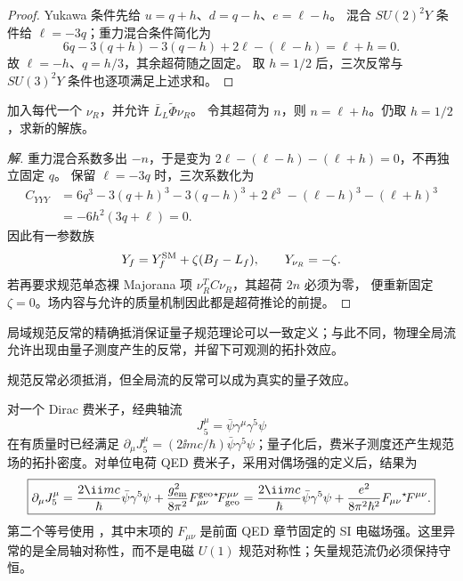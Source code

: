 \begin{proof}
Yukawa 条件先给 $u=q+h$、$d=q-h$、$e=\ell-h$。
混合 $SU(2)^2Y$ 条件给 $\ell=-3q$；重力混合条件简化为
\begin{equation*}
6q-3(q+h)-3(q-h)+2\ell-(\ell-h)=\ell+h=0.
\end{equation*}
故 $\ell=-h$、$q=h/3$，其余超荷随之固定。
取 $h=1/2$ 后，三次反常与 $SU(3)^2Y$ 条件也逐项满足上述求和。
\end{proof}

\begin{example}[加入右手中微子以后超荷约束怎样变化]
加入每代一个 $\nu_R$，并允许 $\bar L_L\widetilde\Phi\nu_R$。
令其超荷为 $n$，则 $n=\ell+h$。仍取 $h=1/2$，求新的解族。
\end{example}
\begin{proof}[解]
重力混合系数多出 $-n$，于是变为
$2\ell-(\ell-h)-(\ell+h)=0$，不再独立固定 $q$。
保留 $\ell=-3q$ 时，三次系数化为
\begin{align*}
C_{YYY}
&=6q^3-3(q+h)^3-3(q-h)^3
+2\ell^3-(\ell-h)^3-(\ell+h)^3\\
&=-6h^2(3q+\ell)=0.
\end{align*}
因此有一参数族
\begin{equation}
Y_f=Y_f^{\rm SM}+\zeta(B_f-L_f),\qquad Y_{\nu_R}=-\zeta.
\label{eq:sm-hypercharge-with-nur-family-dp126}
\end{equation}
若再要求规范单态裸 Majorana 项 $\nu_R^TC\nu_R$，其超荷 $2n$ 必须为零，
便重新固定 $\zeta=0$。场内容与允许的质量机制因此都是超荷推论的前提。
\end{proof}

\label{subsec:sm-global-axial-anomaly-dp32}
局域规范反常的精确抵消保证量子规范理论可以一致定义；与此不同，物理全局流允许出现由量子测度产生的反常，并留下可观测的拓扑效应。

规范反常必须抵消，但全局流的反常可以成为真实的量子效应。\begin{proposition}[轴流反常与电磁 SI 场强]
对一个 Dirac 费米子，经典轴流
\begin{equation*}
 J_5^\mu=\bar\psi\gamma^\mu\gamma^5\psi
\end{equation*}
在有质量时已经满足 $\partial_\mu J_5^\mu=(2\ii mc/\hbar)\bar\psi\gamma^5\psi$；量子化后，费米子测度还产生规范场的拓扑密度。对单位电荷 QED 费米子，采用对偶场强的定义后，结果为
\begin{equation}
 \boxed{
 \partial_\mu J_5^\mu
 =\frac{2\ii mc}{\hbar}\bar\psi\gamma^5\psi
 +\frac{g_{\rm em}^2}{8\pi^2}
 F_{\mu\nu}^{\rm geo}{}^\star\!F_{\rm geo}^{\mu\nu}
 =\frac{2\ii mc}{\hbar}\bar\psi\gamma^5\psi
 +\frac{e^2}{8\pi^2\hbar^2}
 F_{\mu\nu}{}^\star\!F^{\mu\nu}.}
 \label{eq:abj-anomaly-qed-dp11}
\end{equation}
第二个等号使用 ，其中末项的 $F_{\mu\nu}$ 是前面 QED 章节固定的 SI 电磁场强。这里异常的是全局轴对称性，而不是电磁 $U(1)$ 规范对称性；矢量规范流仍必须保持守恒。
\end{proposition}


